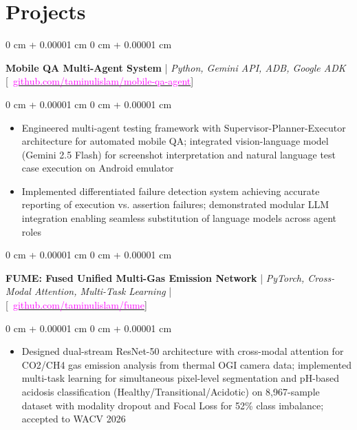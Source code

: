 \documentclass[9pt, letterpaper]{article}
\newenvironment{highlights}{
    \begin{itemize}[
        topsep=0.05 cm,
        parsep=0.05 cm,
        partopsep=0pt,
        itemsep=0pt,
        leftmargin=0 cm + 10pt
    ]
}{
    \end{itemize}
} %
\newenvironment{onecolentry}{
    \begin{adjustwidth}{
        0 cm + 0.00001 cm
    }{
        0 cm + 0.00001 cm
    }
}{
    \end{adjustwidth}
} %
\begin{document}
\section{Projects}

\begin{onecolentry}
    \textbf{Mobile QA Multi-Agent System} | \textit{Python, Gemini API, ADB, Google ADK}
    {[\small \faGithub\ \href{https://github.com/taminulislam/mobile-qa-agent}{\textcolor{magenta}{github.com/taminulislam/mobile-qa-agent}}]}
\end{onecolentry}
\vspace{0.05 cm}
\begin{onecolentry}
    \begin{highlights}
        \item Engineered multi-agent testing framework with Supervisor-Planner-Executor architecture for automated mobile QA; integrated vision-language model (Gemini 2.5 Flash) for screenshot interpretation and natural language test case execution on Android emulator

        \item Implemented differentiated failure detection system achieving accurate reporting of execution vs. assertion failures; demonstrated modular LLM integration enabling seamless substitution of language models across agent roles
    \end{highlights}
\end{onecolentry}
\vspace{0.1 cm}

\begin{onecolentry}
    \textbf{FUME: Fused Unified Multi-Gas Emission Network} | \textit{PyTorch, Cross-Modal Attention, Multi-Task Learning} | \\
    {[\small \faGithub\ \href{https://github.com/taminulislam/fume}{\textcolor{magenta}{github.com/taminulislam/fume}}]}
\end{onecolentry}
\vspace{0.05 cm}
\begin{onecolentry}
    \begin{highlights}
        \item Designed dual-stream ResNet-50 architecture with cross-modal attention for CO2/CH4 gas emission analysis from thermal OGI camera data; implemented multi-task learning for simultaneous pixel-level segmentation and pH-based acidosis classification (Healthy/Transitional/Acidotic) on 8,967-sample dataset with modality dropout and Focal Loss for 52\% class imbalance; accepted to WACV 2026
    \end{highlights}
\end{onecolentry}
\vspace{0.1 cm}
\end{document}
